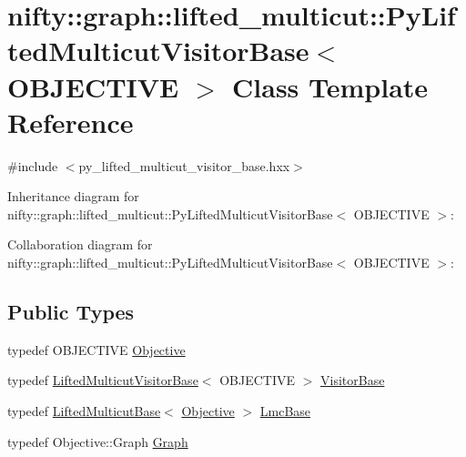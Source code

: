 \hypertarget{classnifty_1_1graph_1_1lifted__multicut_1_1PyLiftedMulticutVisitorBase}{}\section{nifty\+:\+:graph\+:\+:lifted\+\_\+multicut\+:\+:Py\+Lifted\+Multicut\+Visitor\+Base$<$ O\+B\+J\+E\+C\+T\+I\+V\+E $>$ Class Template Reference}
\label{classnifty_1_1graph_1_1lifted__multicut_1_1PyLiftedMulticutVisitorBase}


{\ttfamily \#include $<$py\+\_\+lifted\+\_\+multicut\+\_\+visitor\+\_\+base.\+hxx$>$}



Inheritance diagram for nifty\+:\+:graph\+:\+:lifted\+\_\+multicut\+:\+:Py\+Lifted\+Multicut\+Visitor\+Base$<$ O\+B\+J\+E\+C\+T\+I\+V\+E $>$\+:


Collaboration diagram for nifty\+:\+:graph\+:\+:lifted\+\_\+multicut\+:\+:Py\+Lifted\+Multicut\+Visitor\+Base$<$ O\+B\+J\+E\+C\+T\+I\+V\+E $>$\+:
\subsection*{Public Types}
\begin{DoxyCompactItemize}
\item 
typedef O\+B\+J\+E\+C\+T\+I\+V\+E \hyperlink{classnifty_1_1graph_1_1lifted__multicut_1_1PyLiftedMulticutVisitorBase_abfaa35db83a1cdef6e1adad49b5495e6}{Objective}
\item 
typedef \hyperlink{namespacenifty_1_1graph_1_1lifted__multicut_a0bb4a638bd7a5b2b2f64a9be0df46775}{Lifted\+Multicut\+Visitor\+Base}$<$ O\+B\+J\+E\+C\+T\+I\+V\+E $>$ \hyperlink{classnifty_1_1graph_1_1lifted__multicut_1_1PyLiftedMulticutVisitorBase_a978a2663f67e5f260d2d6c1d5dfd7f03}{Visitor\+Base}
\item 
typedef \hyperlink{classnifty_1_1graph_1_1lifted__multicut_1_1LiftedMulticutBase}{Lifted\+Multicut\+Base}$<$ \hyperlink{classnifty_1_1graph_1_1lifted__multicut_1_1PyLiftedMulticutVisitorBase_abfaa35db83a1cdef6e1adad49b5495e6}{Objective} $>$ \hyperlink{classnifty_1_1graph_1_1lifted__multicut_1_1PyLiftedMulticutVisitorBase_ab6efa594240668fb7839c240b0a68657}{Lmc\+Base}
\item 
typedef Objective\+::\+Graph \hyperlink{classnifty_1_1graph_1_1lifted__multicut_1_1PyLiftedMulticutVisitorBase_ae01d5c86bb86c0c59fd4742b4b31a70a}{Graph}
\end{DoxyCompactItemize}
